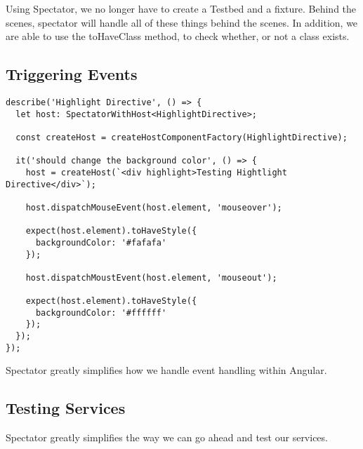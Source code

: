 Using Spectator, we no longer have to create a Testbed and a fixture. Behind
the scenes, spectator will handle all of these things behind the scenes. In
addition, we are able to use the toHaveClass method, to check whether, or not
a class exists.

\subsection{ Triggering Events }

\begin{lstlisting}
describe('Highlight Directive', () => {
  let host: SpectatorWithHost<HighlightDirective>;

  const createHost = createHostComponentFactory(HighlightDirective);

  it('should change the background color', () => {
    host = createHost(`<div highlight>Testing Hightlight Directive</div>`);

    host.dispatchMouseEvent(host.element, 'mouseover');

    expect(host.element).toHaveStyle({
      backgroundColor: '#fafafa'
    });

    host.dispatchMoustEvent(host.element, 'mouseout');

    expect(host.element).toHaveStyle({
      backgroundColor: '#ffffff'
    });
  });
});
\end{lstlisting}

Spectator greatly simplifies how we handle event handling within Angular.

\subsection{ Testing Services }
Spectator greatly simplifies the way we can go ahead and test our services. 
